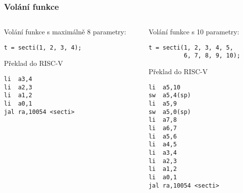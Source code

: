 \documentclass{beamer}
\begin{document}
\begin{frame}[fragile]
\frametitle{Volání funkce}

\begin{columns}
\begin{column}{0.5\textwidth}
Volání funkce s maximálně 8 parametry:

\begin{verbatim}
t = secti(1, 2, 3, 4);
\end{verbatim}

Překlad do RISC-V
\begin{verbatim}
li  a3,4
li  a2,3
li  a1,2
li  a0,1
jal ra,10054 <secti>
\end{verbatim}

\end{column}
\begin{column}{0.5\textwidth}  
Volání funkce s 10 parametry:

\begin{verbatim}
t = secti(1, 2, 3, 4, 5, 
          6, 7, 8, 9, 10);
\end{verbatim}

Překlad do RISC-V
\begin{verbatim}
li  a5,10
sw  a5,4(sp)
li  a5,9
sw  a5,0(sp)
li  a7,8
li  a6,7
li  a5,6
li  a4,5
li  a3,4
li  a2,3
li  a1,2
li  a0,1
jal ra,10054 <secti>
\end{verbatim}
\end{column}
\end{columns}


\end{frame}
\end{document}
